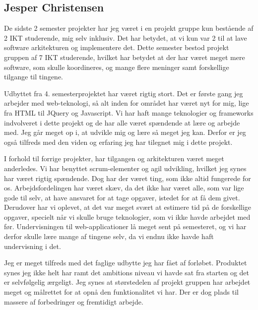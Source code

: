 \subsection*{Jesper Christensen}

De sidste 2 semester projekter har jeg været i en projekt gruppe kun bestående af 2 IKT studerende, mig selv inklusiv. Det har betydet, at vi kun var 2 til at lave software arkitekturen og implementere det. Dette semester bestod projekt gruppen af 7 IKT studerende, hvilket har betydet at der har været meget mere software, som skulle koordineres, og mange flere meninger samt forskellige tilgange til tingene. 

Udbyttet fra 4. semesterprojektet har været rigtig stort. Det er første gang jeg arbejder med web-teknologi, så alt inden for området har været nyt for mig, lige fra HTML til JQuery og Javascript. Vi har haft mange teknologier og frameworks indvolveret i dette projekt og de har alle været spændende at lære og arbejde med. Jeg går meget op i, at udvikle mig og lære så meget jeg kan. Derfor er jeg også tilfreds med den viden og erfaring jeg har tilegnet mig i dette projekt.

I forhold til forrige projekter, har tilgangen og arkitekturen været meget anderledes. Vi har benyttet scrum-elementer og agil udvikling, hvilket jeg synes har været rigtig spændende. Dog har der været ting, som ikke altid fungerede for os. Arbejdsfordelingen har været skæv, da det ikke har været alle, som var lige gode til selv, at have ansvaret for at tage opgaver, istedet for at få dem givet. Derudover har vi oplevet, at det var meget svært at estimere tid på de forskellige opgaver, specielt når vi skulle bruge teknologier, som vi ikke havde arbejdet med før. Undervisningen til web-applicationer lå meget sent på semesteret, og vi har derfor skulle lære mange af tingene selv, da vi endnu ikke havde haft undervisning i det.

Jeg er meget tilfreds med det faglige udbytte jeg har fået af forløbet. Produktet synes jeg ikke helt har ramt det ambitions niveau vi havde sat fra starten og det er selvfølgelig ærgeligt. Jeg synes at størstedelen af projekt gruppen har arbejdet meget og målrettet for at opnå den funktionalitet vi har. Der er dog plads til massere af forbedringer og fremtidigt arbejde.